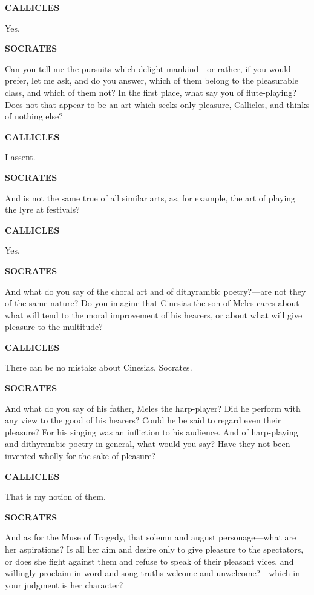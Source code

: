 \documentclass[11pt,letter]{article}
\begin{document}
\par \textbf{CALLICLES}
\par   Yes.

\par \textbf{SOCRATES}
\par   Can you tell me the pursuits which delight mankind—or rather, if you would prefer, let me ask, and do you answer, which of them belong to the pleasurable class, and which of them not? In the first place, what say you of flute-playing? Does not that appear to be an art which seeks only pleasure, Callicles, and thinks of nothing else?

\par \textbf{CALLICLES}
\par   I assent.

\par \textbf{SOCRATES}
\par   And is not the same true of all similar arts, as, for example, the art of playing the lyre at festivals?

\par \textbf{CALLICLES}
\par   Yes.

\par \textbf{SOCRATES}
\par   And what do you say of the choral art and of dithyrambic poetry?—are not they of the same nature? Do you imagine that Cinesias the son of Meles cares about what will tend to the moral improvement of his hearers, or about what will give pleasure to the multitude?

\par \textbf{CALLICLES}
\par   There can be no mistake about Cinesias, Socrates.

\par \textbf{SOCRATES}
\par   And what do you say of his father, Meles the harp-player? Did he perform with any view to the good of his hearers? Could he be said to regard even their pleasure? For his singing was an infliction to his audience. And of harp-playing and dithyrambic poetry in general, what would you say? Have they not been invented wholly for the sake of pleasure?

\par \textbf{CALLICLES}
\par   That is my notion of them.

\par \textbf{SOCRATES}
\par   And as for the Muse of Tragedy, that solemn and august personage—what are her aspirations? Is all her aim and desire only to give pleasure to the spectators, or does she fight against them and refuse to speak of their pleasant vices, and willingly proclaim in word and song truths welcome and unwelcome?—which in your judgment is her character?
\end{document}

